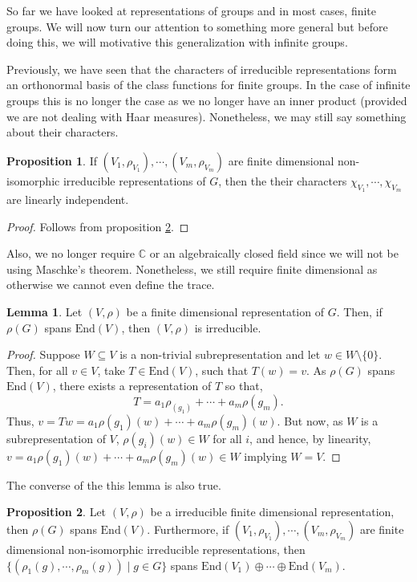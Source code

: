 \documentclass[]{article}
\theoremstyle{definition}
\theoremstyle{definition}
\newtheorem{lemma}{Lemma}[section]
\newtheorem{proposition}{Proposition}[section]
\begin{document}
So far we have looked at representations of groups and in most cases, finite 
groups. We will now turn our attention to something more general but before 
doing this, we will motivative this generalization with infinite groups.

Previously, we have seen that the characters of irreducible representations 
form an orthonormal basis of the class functions for finite groups. In the 
case of infinite groups this is no longer the case as we no longer have 
an inner product (provided we are not dealing with Haar measures). Nonetheless, 
we may still say something about their characters.

\begin{proposition}
  If \((V_1, \rho_{V_1}), \cdots, (V_m, \rho_{V_m})\) are finite dimensional 
  non-isomorphic irreducible representations of \(G\), then the their characters 
  \(\chi_{V_1}, \cdots, \chi_{V_m}\) are linearly independent.
\end{proposition}
\begin{proof}
  Follows from proposition \ref{spans}.
\end{proof}

Also, we no longer require \(\mathbb{C}\) or an algebraically closed field 
since we will not be using Maschke's theorem. Nonetheless, we still require 
finite dimensional as otherwise we cannot even define the trace.

\begin{lemma}
  Let \((V, \rho)\) be a finite dimensional representation of \(G\). Then, 
  if \(\rho(G)\) spans \(\text{End}(V)\), then \((V, \rho)\) is irreducible.
\end{lemma}
\begin{proof}
  Suppose \(W \subseteq V\) is a non-trivial subrepresentation and 
  let \(w \in W \setminus \{0\}\). Then, for all \(v \in V\), take 
  \(T \in \text{End}(V)\), such that \(T(w) = v\). As \(\rho(G)\) spans 
  \(\text{End}(V)\), there exists a representation of \(T\) so that, 
  \[T = a_1 \rho_(g_1) + \cdots + a_m \rho(g_m).\]
  Thus, \(v = Tw = a_1 \rho(g_1)(w) + \cdots + a_m \rho(g_m)(w)\). But now, 
  as \(W\) is a subrepresentation of \(V\), \(\rho(g_i)(w) \in W\) for all \(i\), 
  and hence, by linearity, 
  \(v = a_1 \rho(g_1)(w) + \cdots + a_m \rho(g_m)(w) \in W\) implying \(W = V\).
\end{proof}

The converse of the this lemma is also true. 

\begin{proposition}\label{spans}
  Let \((V, \rho)\) be a irreducible finite dimensional representation, then 
  \(\rho(G)\) spans \(\text{End}(V)\). Furthermore, if \((V_1, \rho_{V_1}), 
  \cdots, (V_m, \rho_{V_m})\) are finite dimensional non-isomorphic 
  irreducible representations, then \(\{(\rho_1(g), \cdots, \rho_m(g)) \mid g \in G\}\) 
  spans \(\text{End}(V_1) \oplus \cdots \oplus \text{End}(V_m)\).
\end{proposition}
\end{document}
